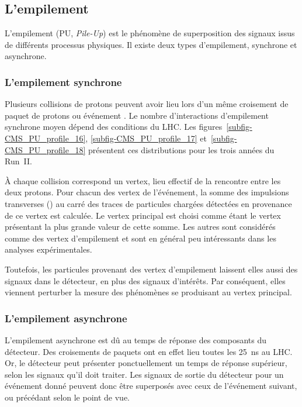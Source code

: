 \subsection{L'empilement}\label{chapter-LHC-section-LHC-subsec-PU}
L'empilement (PU, \emph{Pile-Up}) est le phénomène de superposition des signaux issus de différents processus physiques.
Il existe deux types d'empilement, synchrone et asynchrone.
\subsubsection{L'empilement synchrone}
Plusieurs collisions de protons peuvent avoir lieu lors d'un même  croisement de paquet de protons ou \og événement \fg.
Le nombre d'interactions d'empilement synchrone moyen dépend des conditions du LHC.
Les figures~\ref{subfig-CMS_PU_profile_16}, \ref{subfig-CMS_PU_profile_17} et~\ref{subfig-CMS_PU_profile_18} présentent ces distributions pour les trois années du Run~II.
\par À chaque collision correspond un vertex, lieu effectif de la rencontre entre les deux protons.
Pour chacun des vertex de l'événement, la somme des impulsions transverses (\pT) au carré des traces de particules chargées détectées en provenance de ce vertex est calculée.
Le vertex principal est choisi comme étant le vertex présentant la plus grande valeur de cette somme.
Les autres sont considérés comme des vertex d'empilement et sont en général peu intéressants dans les analyses expérimentales.
\par Toutefois, les particules provenant des vertex d'empilement laissent elles aussi des signaux dans le détecteur, en plus des signaux d'intérêts.
Par conséquent, elles viennent perturber la mesure des phénomènes se produisant au vertex principal.
\subsubsection{L'empilement asynchrone}
L'empilement asynchrone est dû au temps de réponse des composants du détecteur.
Des croisements de paquets ont en effet lieu toutes les \SI{25}{\nano\second} au LHC.
Or, le détecteur peut présenter ponctuellement un temps de réponse supérieur, selon les signaux qu'il doit traiter.
Les signaux de sortie du détecteur pour un événement donné peuvent donc être superposés avec ceux de l'événement suivant, ou précédant selon le point de vue.
